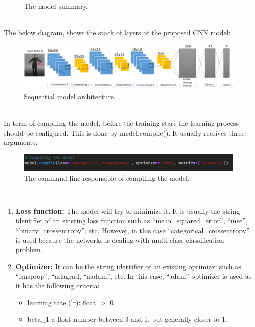 \begin{itemize}
\begin{itemize}
\begin{figure}[ht]
    \decoRule
    \caption[The model summary.]{The model summary.}
    \label{fig:la}
    \end{figure}\hfill \\
    The below diagram, shows the stack of layers of the proposed CNN model:
    \begin{figure}[ht]
    \centering
    \includegraphics{Figures/cnnmm}
    \decoRule
    \caption[Sequential model architecture.]{Sequential model architecture.}
    \label{fig:la}
    \end{figure}\hfill \\
In term of compiling the model, before the training start the learning process should be configured. This is done by model.compile(). It usually receives three arguments:
\end{itemize}
 \begin{figure}[ht]
    \centering
    \includegraphics{Figures/compill}
    \decoRule
    \caption[The command line responsible of compiling the model.]{The command line responsible of compiling the model.}
    \label{fig:la}
    \end{figure}\hfill \\
    \begin{enumerate}
        \item \textbf{Loss function:} The model will try to minimize it. It is usually the string identifier of an existing loss function such as “mean\_squared\_error”, “mse”, “binary\_crossentropy”, etc. However, in this case “categorical\_crossentropy” is used because the networks is dealing with multi-class classification problem.
        \item \textbf{Optimizer:} It can be the string identifier of an existing optimizer such as “rmsprop”, “adagrad, “nadam”, etc. In this case, “adam” optimizer is used as it has the following criteria:
        \begin{itemize}
            \item learning rate (lr): float $>$ 0.
            \item beta\_1 a float number between 0 and 1, but generally closer to 1.

\end{itemize}
\end{enumerate}
\end{itemize}
